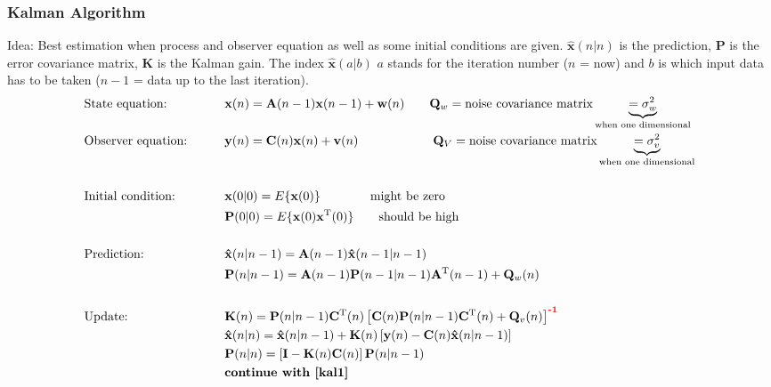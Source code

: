 \subsubsection{Kalman Algorithm}
Idea: Best estimation when process and observer equation as well as some initial conditions are given.
$\mathbf{\hat x}(n|n)$ is the prediction, $\mathbf{P}$ is the error covariance matrix, $\mathbf{K}$ is the Kalman gain.
The index $\mathbf{\hat x}(a|b)$ $a$ stands for the iteration number ($n$ = now) and $b$ is which input
data has to be taken ($n-1$ = data up to the last iteration). 
\begin{alignat}{2}
	&\text{State equation:}\qquad&&\mathbf{x}(n) =\mathbf{A}(n-1)\mathbf{x}(n-1) + \mathbf{w}(n) \qquad 
	 \mathbf{Q}_w = \text{noise covariance matrix} \underbrace{= \sigma_w^2}_{\text{when one dimensional}}  \nonumber\\
	&\text{Observer equation:}\qquad&&\mathbf{y}(n) =\mathbf{C}(n)\mathbf{x}(n) + \mathbf{v}(n) \qquad \qquad \quad \quad
   \mathbf{Q}_V = \text{noise covariance matrix} \underbrace{= \sigma_v^2}_{\text{when one dimensional}} \nonumber\\
	\nonumber\\
	&\text{Initial condition:}	\qquad	&&\mathbf{x}(0|0)=E\{\mathbf{x}(0)\} \qquad \qquad \text{might be zero}\nonumber\\
										&&&\mathbf{P}(0|0)=E\{\mathbf{x}(0)\mathbf{x}^{\mathrm T}(0)\} \qquad \text{should be high}\nonumber\\
	\nonumber\\
	\label{kal1}
	&\text{Prediction:}			\qquad	&&\mathbf{\hat{x}}(n|n-1)=\mathbf{A}(n-1)\mathbf{\hat{x}}(n-1|n-1)\\
										&&&\mathbf{P}(n|n-1)=\mathbf{A}(n-1)\mathbf{P}(n-1|n-1)\mathbf{A}^{\mathrm T}(n-1) + \mathbf{Q}_w(n)\\
	\nonumber\\
	&\text{Update:}				\qquad	&&\mathbf{K}(n)=\mathbf{P}(n|n-1)\mathbf{C}^{\mathrm T}(n)\left[\mathbf{C}(n) \mathbf{P}(n|n-1)\mathbf{C}^{\mathrm T}(n)+\mathbf{Q}_v(n)\right]^{\textbf{\textcolor{red}{-1}}}\\
										&&&\mathbf{\hat{x}}(n|n)=\mathbf{\hat{x}}(n|n-1)+\mathbf{K}(n)\left[\mathbf{y}(n)-\mathbf{C}(n)\mathbf{\hat{x}}(n|n-1)\right]\\
										&&&\mathbf{P}(n|n)=\left[\mathbf{I}-\mathbf{K}(n)\mathbf{C}(n)\right]\mathbf{P}(n|n-1)\\
										&&&\textbf{continue with \eqref{kal1}}	
\end{alignat}

